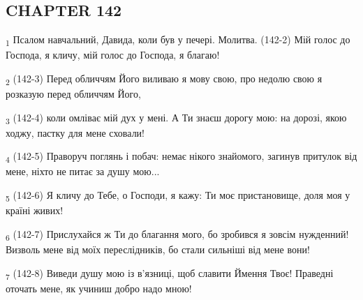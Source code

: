 \subsection{CHAPTER 142}
\begin{tcolorbox}
\textsubscript{1} Псалом навчальний, Давида, коли був у печері. Молитва. (142-2) Мій голос до Господа, я кличу, мій голос до Господа, я благаю!
\end{tcolorbox}
\begin{tcolorbox}
\textsubscript{2} (142-3) Перед обличчям Його виливаю я мову свою, про недолю свою я розказую перед обличчям Його,
\end{tcolorbox}
\begin{tcolorbox}
\textsubscript{3} (142-4) коли омліває мій дух у мені. А Ти знаєш дорогу мою: на дорозі, якою ходжу, пастку для мене сховали!
\end{tcolorbox}
\begin{tcolorbox}
\textsubscript{4} (142-5) Праворуч поглянь і побач: немає нікого знайомого, загинув притулок від мене, ніхто не питає за душу мою...
\end{tcolorbox}
\begin{tcolorbox}
\textsubscript{5} (142-6) Я кличу до Тебе, о Господи, я кажу: Ти моє пристановище, доля моя у країні живих!
\end{tcolorbox}
\begin{tcolorbox}
\textsubscript{6} (142-7) Прислухайся ж Ти до благання мого, бо зробився я зовсім нужденний! Визволь мене від моїх переслідників, бо стали сильніші від мене вони!
\end{tcolorbox}
\begin{tcolorbox}
\textsubscript{7} (142-8) Виведи душу мою із в'язниці, щоб славити Ймення Твоє! Праведні оточать мене, як учиниш добро надо мною!
\end{tcolorbox}
